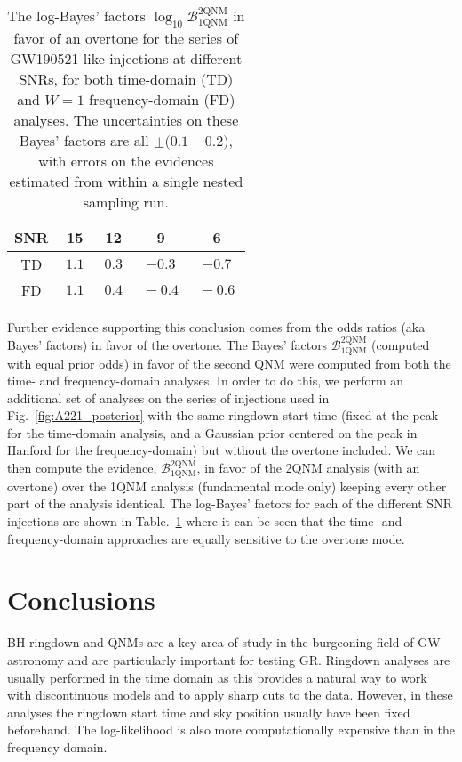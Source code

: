\begin{table}[h]
	\centering
	\begin{tabular}{c|cccc}
		SNR & 15   & 12   & 9   & 6   \\ \hline
		TD & $~ 1.1 ~$ & $0.3$ & $-0.3$ & $-0.7$ \\
		FD & $~ 1.1 ~$ & $~ 0.4 ~$ & $~ -0.4 ~ $ & $~ -0.6 ~$   
	\end{tabular}
	\caption[The log-Bayes' factors in favor of an overtone for the series of GW190521-like injections at different SNRs, for both time-domain and $W=1$ frequency-domain analyses]{ 
		The log-Bayes' factors $\log_{10}\mathcal{B}^{2\mathrm{QNM}}_{1\mathrm{QNM}}$ in favor of an overtone for the series of GW190521-like injections at different SNRs, for both time-domain (TD) and $W=1$ frequency-domain (FD) analyses. 
		The uncertainties on these Bayes' factors are all $\pm (0.1$ -- $0.2)$, with errors on the evidences estimated from within a single nested sampling run.
	}
	\label{tab:bayes_factors}
\end{table}

Further evidence supporting this conclusion comes from the odds ratios (aka Bayes' factors) in favor of the overtone.
The Bayes' factors $\mathcal{B}^{2\mathrm{QNM}}_{1\mathrm{QNM}}$ (computed with equal prior odds) in favor of the second QNM were computed from both the time- and frequency-domain analyses. 
In order to do this, we perform an additional set of analyses on the series of injections used in Fig.~\ref{fig:A221_posterior} with the same ringdown start time (fixed at the peak for the time-domain analysis, and a Gaussian prior centered on the peak in Hanford for the frequency-domain) but without the overtone included.
We can then compute the evidence, $\mathcal{B}_{1\mathrm{QNM}}^{2\mathrm{QNM}}$, in favor of the 2QNM analysis (with an overtone) over the 1QNM analysis (fundamental mode only) keeping every other part of the analysis identical. 
The log-Bayes' factors for each of the different SNR injections are shown in Table.~\ref{tab:bayes_factors} where it can be seen that the time- and frequency-domain approaches are equally sensitive to the overtone mode.


\section{Conclusions}\label{sec:discussion}

BH ringdown and QNMs are a key area of study in the burgeoning field of GW astronomy and are particularly important for testing GR.
Ringdown analyses are usually performed in the time domain as this provides a natural way to work with discontinuous models and to apply sharp cuts to the data. 
However, in these analyses the ringdown start time and sky position usually have been fixed beforehand.
The log-likelihood is also more computationally expensive than in the frequency domain.


